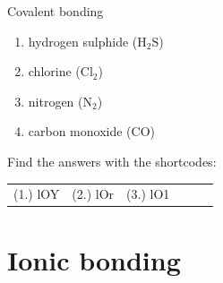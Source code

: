 \begin{exercises}{Covalent bonding
        }
\begin{enumerate}[noitemsep, label=\textbf{\arabic*}. ]
\label{m38704*id140030}\begin{enumerate}[noitemsep, label=\textbf{\alph*}. ] 
            \label{m38704*uid13}\item hydrogen sulphide ($\text{H}_{2}\text{S}$)
\label{m38704*uid14}\item chlorine ($\text{Cl}_{2}$)
\item nitrogen ($\text{N}_2$)
\item carbon monoxide ($\text{CO}$)
\end{enumerate}
                \end{enumerate}
      \label{m38704*eip-790}
\par {} Find the answers with the shortcodes:
 \par \begin{tabular}[h]{cccccc}
 (1.) lOY  &  (2.) lOr  &  (3.) lO1  & \end{tabular}
\end{exercises}

         \section{Ionic bonding}
    \nopagebreak
      \label{m38684*uid54}

